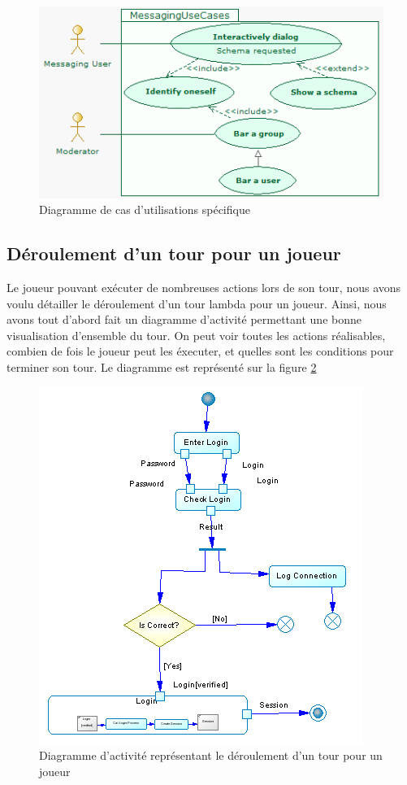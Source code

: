 \documentclass[12pt]{article}
\begin{document}
\begin{figure}[!h] 
\centerline{\includegraphics[scale=0.60]{img/diag_cas_dut2_ex.jpeg}}
   \caption{\label{étiquette} Diagramme de cas d'utilisations spécifique}
\label{casdut2}
\end{figure}

\subsection{Déroulement d'un tour pour un joueur}
Le joueur pouvant exécuter de nombreuses actions lors de son tour, nous avons voulu détailler le déroulement d'un tour lambda pour un joueur. Ainsi, nous avons tout d'abord fait un diagramme d'activité permettant une bonne visualisation d'ensemble du tour. On peut voir toutes les actions réalisables, combien de fois le joueur peut les éxecuter, et quelles sont les conditions pour terminer son tour. Le diagramme est représenté sur la figure \ref{activiteTour}

\begin{figure}[!h] 
\centerline{\includegraphics[scale=0.60]{img/activite_tour_ex.png}}
   \caption{\label{étiquette} Diagramme d'activité représentant le déroulement d'un tour pour un joueur}
\label{activiteTour}
\end{figure}
\end{document}
